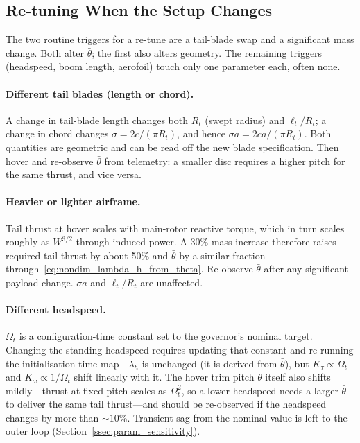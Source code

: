\documentclass[11pt,a4paper]{article}
\newcommand{\OmegaT}{\Omega_t}
\newcommand{\Rt}{R_t}
\newcommand{\btheta}{\bar{\theta}}
\begin{document}
\subsection{Re-tuning When the Setup Changes}\label{ssec:param_retune}

The two routine triggers for a re-tune are a tail-blade swap and a
significant mass change. Both alter \(\btheta\); the first also
alters geometry. The remaining triggers (headspeed, boom length,
aerofoil) touch only one parameter each, often none.

\paragraph{Different tail blades (length or chord).}
A change in tail-blade length changes both \(\Rt\) (swept radius)
and \(\ell_t/\Rt\); a change in chord changes
\(\sigma=2c/(\pi\Rt)\), and hence \(\sigma a=2ca/(\pi\Rt)\). Both
quantities are geometric and can be read off the new blade
specification. Then hover and re-observe \(\btheta\) from telemetry:
a smaller disc requires a higher pitch for the same thrust, and
vice versa.

\paragraph{Heavier or lighter airframe.}
Tail thrust at hover scales with main-rotor reactive torque, which
in turn scales roughly as \(W^{3/2}\) through induced power. A 30\%
mass increase therefore raises required tail thrust by about 50\%
and \(\btheta\) by a similar fraction
through~\eqref{eq:nondim_lambda_h_from_theta}. Re-observe \(\btheta\)
after any significant payload change. \(\sigma a\) and
\(\ell_t/\Rt\) are unaffected.

\paragraph{Different headspeed.}
\(\OmegaT\) is a configuration-time constant set to the governor's nominal
target. Changing the standing headspeed requires updating that
constant and re-running the initialisation-time map---\(\lambda_h\) is
unchanged (it is derived from \(\btheta\)), but \(K_\tau\propto\OmegaT\)
and \(K_\omega\propto 1/\OmegaT\) shift linearly with it. The hover trim
pitch \(\btheta\) itself also shifts mildly---thrust at fixed pitch
scales as \(\OmegaT^2\), so a lower headspeed needs a larger
\(\btheta\) to deliver the same tail thrust---and should be
re-observed if the headspeed changes by more than
\(\sim 10\%\). Transient sag from the nominal value is left to the
outer loop (Section~\ref{ssec:param_sensitivity}).
\end{document}
